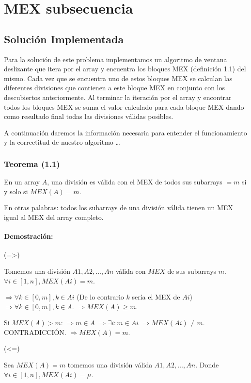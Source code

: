 \documentclass{article}
\begin{document}
\section*{MEX subsecuencia}

\subsection*{Solución Implementada}

Para la solución de este problema implementamos un algoritmo de ventana deslizante que itera por el array y encuentra los bloques MEX (definición 1.1) del mismo. Cada vez que se encuentra uno de estos bloques MEX se calculan las diferentes divisiones que contienen a este bloque MEX en conjunto con los descubiertos anteriormente. Al terminar la iteración por el array y encontrar todos los bloques MEX se suma el valor calculado para cada bloque MEX dando como resultado final todas las divisiones válidas posibles.

A continuación daremos la información necesaria para entender el funcionamiento y la correctitud de nuestro algoritmo \dots

\subsubsection*{Teorema (1.1)}

En un array $A$, una división es válida con el MEX de todos sus subarrays $= m$ si y solo si $MEX(A) = m$.

En otras palabras: todos los subarrays de una división válida tienen un MEX igual al MEX del array completo.

\paragraph*{Demostración:}

(=>)

Tomemos una división $A1, A2, \dots , An$ válida con $MEX$ de sus subarrays $m$. $\forall i \in [1, n], MEX(Ai)= m$.

$\Rightarrow \forall k \in [0,m], k \in Ai$ (De lo contrario $k$ sería el MEX de $Ai$) $\Rightarrow \forall k \in [0,m], k \in A$. $\Rightarrow MEX(A) \geq m$.

Si $MEX(A) > m$: $\Rightarrow m \in A$ $\Rightarrow \exists i : m \in Ai$ $\Rightarrow MEX(Ai) \neq m$. CONTRADICCIÓN. $\Rightarrow MEX(A) = m$.

(<=)

Sea $MEX(A) = m$ tomemos una división válida $A1, A2, \dots , An$. Donde $\forall i \in [1,n], MEX(Ai) = \mu$.
\end{document}
